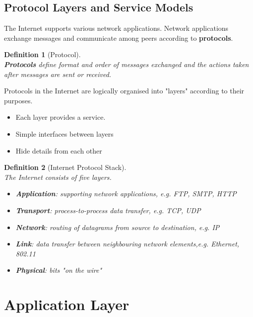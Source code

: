 \documentclass[12pt]{article}
\newtheorem{definition}{Definition}[section]
\theoremstyle{definition}
\begin{document}
\subsection{Protocol Layers and Service Models}
The Internet supports various network applications. Network applications exchange messages and communicate among peers according to \textbf{protocols}.
\begin{definition}[Protocol]
\hfill\\\normalfont \textbf{Protocols} define \textit{format} and \textit{order} of messages exchanged and the \textit{actions} taken after messages are sent or received.
\end{definition}
Protocols in the Internet are logically organised into "layers" according to their purposes.
\begin{itemize}
  \item Each layer provides a service.
  \item Simple interfaces between layers
  \item Hide details from each other
\end{itemize}
\begin{definition}[Internet Protocol Stack]
\hfill\\\normalfont The Internet consists of five layers.
\begin{itemize}
  \item \textbf{Application}: supporting network applications, e.g. FTP, SMTP, HTTP
  \item \textbf{Transport}: process-to-process data transfer, e.g. TCP, UDP
  \item \textbf{Network}: routing of datagrams from source to destination, e.g. IP
  \item \textbf{Link}: data transfer between neighbouring network elements,e.g. Ethernet, 802.11
  \item \textbf{Physical}: bits "on the wire"
\end{itemize}
\end{definition}
\clearpage
\section{Application Layer}
\end{document}
